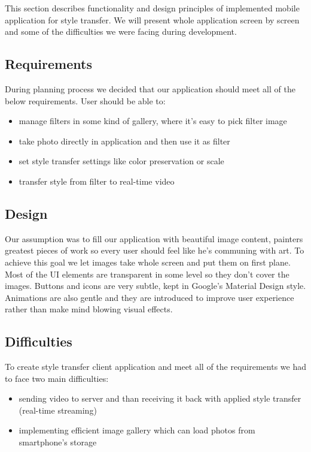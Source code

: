 \documentclass[../Main.tex]{subfiles}
\begin{document}
This section describes functionality and design principles of implemented mobile application for 
style transfer. We will present whole application screen by screen and some
of the difficulties we were facing during development.

\subsection{Requirements}
During planning process we decided that our application should meet all of the 
below requirements.
User should be able to:
\begin{itemize}
    \item manage filters in some kind of gallery, where it's easy to pick filter image
    \item take photo directly in application and then use it as filter
    \item set style transfer settings like color preservation or scale
    \item transfer style from filter to real-time video
\end{itemize}

\subsection{Design}
Our assumption was to fill our application with beautiful image content,
painters greatest pieces of work so every user should feel like he's communing with art.
To achieve this goal we let images take whole screen and put them on first plane.
Most of the UI elements are transparent in some level so they don't cover the images.
Buttons and icons are very subtle, kept in Google's Material Design style.
Animations are also gentle and they are introduced to improve user experience rather
than make mind blowing visual effects.

\subsection{Difficulties}
To create style transfer client application and meet all of the requirements
we had to face two main difficulties:
\begin{itemize}
    \item sending video to server and than receiving it back with applied style transfer (real-time streaming)
    \item implementing efficient image gallery which can load photos from smartphone's storage
\end{itemize}
\end{document}
